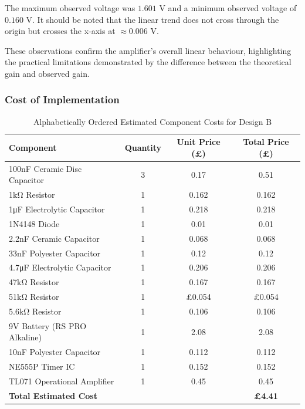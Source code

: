 The maximum observed voltage was \(1.601\) V and a minimum observed voltage of \(0.160\) V. It should be noted that the linear trend does not cross through the origin but crosses the x-axis at \(\approx0.006\) V.

These observations confirm the amplifier's overall linear behaviour, highlighting the practical limitations demonstrated by the difference between the theoretical gain and observed gain.

\subsubsection{Cost of Implementation}

\begin{table}[H]
\centering
\caption{Alphabetically Ordered Estimated Component Costs for Design B}
\begin{tabular}{|l|c|c|c|}
\hline
\textbf{Component}                & \textbf{Quantity} & \textbf{Unit Price (£)} & \textbf{Total Price (£)}\\ \hline
100nF Ceramic Disc Capacitor\cite{rs_100nfcap} & 3 & 0.17 & 0.51\\ \hline
1kΩ Resistor \cite{rs_1kresistor} & 1 & 0.162 & 0.162\\ \hline
1μF Electrolytic Capacitor \cite{rs_1ufcap} & 1 & 0.218 & 0.218\\ \hline
1N4148 Diode \cite{rs_1n4148} & 1 & 0.01 & 0.01\\ \hline
2.2nF Ceramic Capacitor \cite{rs_2nfcap}& 1 & 0.068 & 0.068\\ \hline
33nF Polyester Capacitor  \cite{rs_33nfcap} & 1 & 0.12 & 0.12\\ \hline
4.7μF Electrolytic Capacitor \cite{rs_5ufcap}& 1 & 0.206 & 0.206\\ \hline
47kΩ Resistor \cite{rs_47kresistor}& 1 & 0.167 & 0.167\\ \hline
51kΩ Resistor \cite{rs_51kresistor} & 1 & £0.054 & £0.054\\ \hline
5.6kΩ Resistor \cite{rs_6kresistor}& 1 & 0.106 & 0.106\\ \hline
9V Battery (RS PRO Alkaline) \cite{rs_9vbattery} & 1 & 2.08 & 2.08 \\ \hline
10nF Polyester Capacitor \cite{rs_10nfcap} & 1 & 0.112 & 0.112\\ \hline
NE555P Timer IC \cite{rs_ne555p} & 1 & 0.152 & 0.152\\ \hline
TL071 Operational Amplifier \cite{rs_tl071} & 1 & 0.45 & 0.45\\ \hline\hline
\textbf{Total Estimated Cost} &&&\textbf{£4.41}\\ \hline
\end{tabular}
\label{tab:component_info_db}
\end{table}

